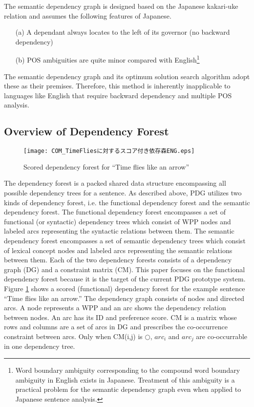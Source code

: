 The semantic dependency graph is designed based on the Japanese kakari-uke
relation and assumes the following features of Japanese.
\begin{itemize}
\item [(a)] A dependant always locates to the left of its governor (no backward dependency)
\item [(b)] POS ambiguities are quite minor compared with English\footnote{Word boundary ambiguity corresponding to the compound word
boundary ambiguity in English exists in Japanese. Treatment of this
ambiguity is a practical problem for the semantic dependency graph even when
applied to Japanese sentence analysis.}
\end{itemize}

{\mynoindent}The semantic dependency graph and its optimum solution
search algorithm adopt these as their premises. Therefore, this method
is inherently inapplicable to languages like English that require
backward dependency and multiple POS analysis.


\subsection{Overview of Dependency Forest}

 \begin{figure}[b]
 \begin{center}
     \texttt{[image: COM\_TimeFliesに対するスコア付き依存森ENG.eps]}
 \end{center}
\myfiglabelskippre
\caption{Scored dependency forest for ``Time flies like an arrow''}
\label{fig:WDFForExample}
\end{figure}

The dependency forest is a packed shared data structure encompassing
all possible dependency trees for a sentence. As described above, PDG
utilizes two kinds of dependency forest, i.e. the functional
dependency forest and the semantic dependency forest.  The functional
dependency forest encompasses a set of functional (or syntactic)
dependency trees which consist of WPP nodes and labeled arcs
representing the syntactic relations between them. The semantic
dependency forest encompasses a set of semantic dependency trees which
consist of lexical concept nodes and labeled arcs representing the
semantic relations between them. Each of the two dependency forests
consists of a dependency graph (DG) and a constraint matrix (CM).
This paper focuses on the functional dependency forest because it is
the target of the current PDG prototype system. Figure
\ref{fig:WDFForExample} shows a scored (functional) dependency forest
for the example sentence ``Time flies like an arrow.'' The dependency
graph consists of nodes and directed arcs. A node represents a WPP and
an arc shows the dependency relation between nodes. An arc has its ID
and preference score. CM is a matrix whose rows and columns are a set
of arcs in DG and prescribes the co-occurrence constraint between
    arcs. Only when CM(i,j) is $\bigcirc$, 
$arc_i$ and $arc_j$ are co-occurrable
in one dependency tree.

